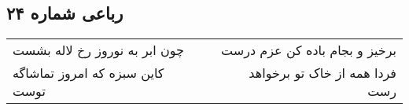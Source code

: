\begin{center}
\section*{رباعی شماره ۲۴}
\label{sec:sh024}
\begin{longtable}{l p{0.5cm} r}
چون ابر به نوروز رخ لاله بشست
&&
برخیز و بجام باده کن عزم درست
\\
کاین سبزه که امروز تماشاگه توست
&&
فردا همه از خاک تو برخواهد رست
\\
\end{longtable}
\end{center}
